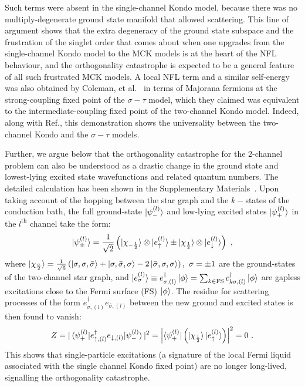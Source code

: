 \documentclass{iopart}
\begin{document}
Such terms were absent in the single-channel Kondo model, because there was no multiply-degenerate ground state manifold that allowed scattering.
This line of argument shows that the extra degeneracy of the ground state subspace and the frustration of the singlet order that comes about when one upgrades from the single-channel Kondo model to the MCK models is at the heart of the NFL behaviour, and the orthogonality catastrophe is expected to be a general feature of all such frustrated MCK models.
A local NFL term and a similar self-energy was also obtained by Coleman, et al.~\cite{Coleman_tsvelik} in terms of Majorana fermions at the strong-coupling fixed point of the \(\sigma-\tau\) model, which they claimed was equivalent to the intermediate-coupling fixed point of the two-channel Kondo model.
Indeed, along with Ref.\cite{schofield_1997}, this demonstration shows the universality between the two-channel Kondo and the \(\sigma-\tau\) models. 

Further, we argue below that the orthogonality catastrophe for the 2-channel problem can also be understood as a drastic change in the ground state and lowest-lying excited state wavefunctions and related quantum numbers. The detailed calculation has been shown in the Supplementary Materials~\cite{SM}. Upon taking account of the hopping between the star graph and the \(k-\)states of the conduction bath, the full ground-state \(\ket{\psi_-^{(l)}}\) and low-lying excited states \(\ket{\psi_+^{(l)}}\)  in the \(l^\text{th}\) channel  take the form:
\begin{equation}\begin{aligned}
\ket{\psi_\pm^{(l)}} = \frac{1}{\sqrt 2}\left(\ket{\chi_{-\frac{1}{2}}}\otimes\ket{e_\uparrow^{(l)}} \pm \ket{\chi_{\frac{1}{2}}}\otimes\ket{e_\downarrow^{(l)}}\right)~,
\end{aligned}\end{equation}
where \(\ket{\chi_{\frac{\sigma}{2}}} = \frac{1}{\sqrt 6}\left( \ket{\sigma,\sigma,\bar\sigma} + \ket{\sigma,\bar\sigma,\sigma} -2\ket{\bar\sigma,\sigma,\sigma} \right),~ \sigma=\pm 1\) are the ground-states of the two-channel star graph, and \(\ket{e_\sigma^{(l)}} \equiv e^\dagger_{\sigma,(l)}\ket{\phi} = \sum_{k\in\text{FS}}c^\dagger_{k\sigma,(l)}\ket{\phi}\) are gapless excitations close to the Fermi surface (FS) \(\ket{\phi}\). The residue for scattering processes of the form \(e^\dagger_{\sigma,(l)} e_{\bar\sigma,(l)}\) between the new ground and excited states is then found to vanish:
\begin{equation}
	Z = |\braket{\psi_+^{(l)}| e^\dagger_{\uparrow,(l)} e_{\downarrow,(l)} | \psi_-^{(l)}}|^2 = \left|\bra{\psi_+^{(l)}}\left(\ket{\chi_{\frac{1}{2}}}\ket{e_\uparrow^{(l)}}\right)\right|^2 = 0~.
\end{equation}
This shows that single-particle excitations (a signature of the local Fermi liquid associated with the single channel Kondo fixed point) are no longer long-lived, signalling the orthogonality catastrophe.
\end{document}
